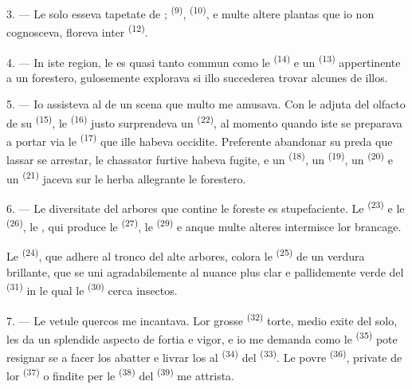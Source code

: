 3. --- Le solo esseva tapetate de ; 
\textsuperscript{(9)},  \textsuperscript{(10)}, e multe altere
plantas que io non cognosceva, floreva inter 
\textsuperscript{(12)}.

4. --- In iste region, le  es quasi tanto commun como le
 \textsuperscript{(14)} e un 
\textsuperscript{(13)} appertinente a un forestero, gulosemente explorava si
illo succederea trovar alcunes de illos.

\VUsaut{3.0mm}
\VUsaut{3.0mm}

5. --- Io assisteva al  de un scena que multo me amusava. Con le
adjuta del olfacto de su  \textsuperscript{(15)}, le
 \textsuperscript{(16)} justo surprendeva un  \textsuperscript{(22)}, al momento quando iste se preparava a portar
via le  \textsuperscript{(17)} que ille habeva occidite.
Preferente abandonar su preda que lassar se arrestar, le chassator furtive habeva
fugite, e un  \textsuperscript{(18)}, un 
\textsuperscript{(19)}, un  \textsuperscript{(20)} e un
 \textsuperscript{(21)} jaceva sur le herba allegrante le forestero.

6. --- Le diversitate del arbores que contine le foreste es stupefaciente. Le
 \textsuperscript{(23)} e le 
\textsuperscript{(26)}, le , qui produce le 
\textsuperscript{(27)}, le  \textsuperscript{(29)} e anque multe
alteres intermisce lor brancage.

Le  \textsuperscript{(24)}, que adhere al tronco del alte
arbores, colora le  \textsuperscript{(25)} de un verdura
brillante, que se uni agradabilemente al nuance plus clar e pallidemente verde
del  \textsuperscript{(31)} in le qual le 
\textsuperscript{(30)} cerca insectos.

\VUsaut{3.0mm}
\VUsaut{3.0mm}

7. --- Le vetule quercos me incantava. Lor grosse 
\textsuperscript{(32)} torte, medio exite del solo, les da un splendide aspecto
de fortia e vigor, e io me demanda como le 
\textsuperscript{(35)} pote resignar se a facer los abatter e livrar los al
 \textsuperscript{(34)} del 
\textsuperscript{(33)}. Le povre  \textsuperscript{(36)}, private
de lor  \textsuperscript{(37)} o findite per le 
\textsuperscript{(38)} del  \textsuperscript{(39)} me
attrista.

